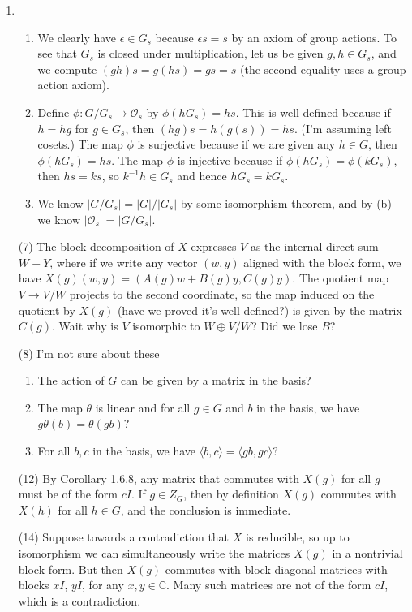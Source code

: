 \documentclass{amsart}
\newcommand{\CC}{\mathbb{C}}
\begin{document}
\begin{enumerate}
\begin{enumerate}
    \end{enumerate}
    \item 
    \begin{enumerate}
        \item We clearly have $\epsilon \in G_s$ because $\epsilon s = s$ by an axiom of group actions.  To see that $G_s$ is closed under multiplication, let us be given $g,h \in G_s$, and we compute $(gh)s = g(hs) = gs = s$ (the second equality uses a group action axiom).
        \item Define $\phi : G/G_s \to \mathcal{O}_s$ by $\phi(hG_s) = hs$.  This is well-defined because if $h=hg$ for $g \in G_s$, then $(hg)s = h(g(s)) = hs$.  (I'm assuming left cosets.)  The map $\phi$ is surjective because if we are given any $h \in G$, then $\phi(hG_s) = hs$.  The map $\phi$ is injective because if $\phi(hG_s) = \phi(kG_s)$, then $hs = ks$, so $k^{-1}h \in G_s$ and hence $hG_s = kG_s$.
        \item We know $\left| G/G_s\right| = |G|/|G_s|$ by some isomorphism theorem, and by (b) we know $|\mathcal{O}_s| = \left| G/G_s\right|$.
    \end{enumerate}
    \item[(7)] The block decomposition of $X$ expresses $V$ as the internal direct sum $W + Y$, where if we write any vector $(w,y)$ aligned with the block form, we have $X(g)(w,y) = (A(g)w + B(g)y, C(g)y)$.  The quotient map $V \to V/W$ projects to the second coordinate, so the map induced on the quotient by $X(g)$ (have we proved it's well-defined?) is given by the matrix $C(g)$. Wait why is $V$ isomorphic to $W \oplus V/W$?  Did we lose $B$?
    \item[(8)] I'm not sure about these
    \begin{enumerate}
        \item The action of $G$ can be given by a matrix in the basis?
        \item The map $\theta$ is linear and for all $g \in G$ and $b$ in the basis, we have $g\theta(b) = \theta (gb)$?
        \item For all $b,c$ in the basis, we have $\langle b,c \rangle = \langle gb,gc \rangle$?
    \end{enumerate}
    \item[(12)] By Corollary 1.6.8, any matrix that commutes with $X(g)$ for all $g$ must be of the form $cI$.  If $g \in Z_G$, then by definition $X(g)$ commutes with $X(h)$ for all $h \in G$, and the conclusion is immediate.
    \item[(14)] Suppose towards a contradiction that $X$ is reducible,
    so up to isomorphism we can simultaneously write the matrices $X(g)$
    in a nontrivial block form.  But then $X(g)$ commutes with block diagonal matrices with blocks $xI$, $yI$, for any $x,y \in \CC$.  Many such matrices are not of the form $cI$, which is a contradiction.
\end{enumerate}
\end{document}
